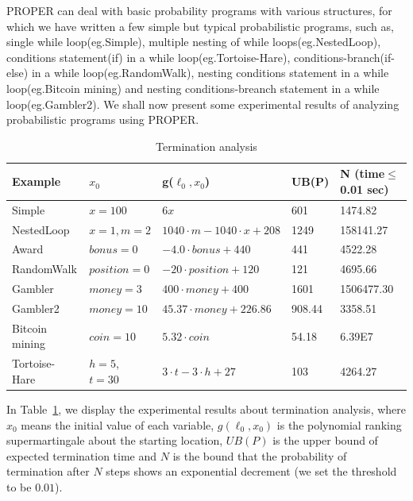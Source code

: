 \documentclass[runningheads]{llncs}
\begin{document}
PROPER can deal with basic probability programs with various structures, for which we have written a few simple but typical probabilistic programs, such as, single while loop(eg.Simple), multiple nesting of while loops(eg.NestedLoop), conditions statement(if) in a while loop(eg.Tortoise-Hare), conditions-branch(if-else) in a while loop(eg.RandomWalk), nesting conditions statement in a while loop(eg.Bitcoin mining) and nesting conditions-breanch statement in a while loop(eg.Gambler2).
We shall now present some experimental results of analyzing probabilistic programs using PROPER. 

\begin{table}[htb]
	\centering
	\caption{Termination analysis}  
	\label{TerminationResult} 
	\begin{center}  
		\begin{tabular}{|l|l|l|l|l|}  
			\hline  	
			Example & $x_0$ & g($\ell_0,x_0$) & UB(P) & N (time$\leq$0.01 sec)\\ \hline  	
			Simple & $x=100$  & $6x$ & 601 & 1474.82 \\ \hline  		
			NestedLoop & $x=1, m=2$ & $1040\cdot m-1040\cdot x+208$ & 1249 & 158141.27 \\  \hline  
			Award & $bonus=0$ & $-4.0\cdot bonus+440$ & 441 &4522.28 \\  \hline  
			RandomWalk & $position=0$ & $-20\cdot position+120$ & 121 & 4695.66 \\  \hline  
			Gambler& $money=3$ & $400\cdot money+400$ & 1601 & 1506477.30 \\ \hline  		 
			Gambler2 & $money=10$ & $45.37 \cdot money+226.86$ & 908.44 & 3358.51 \\  \hline  
			Bitcoin mining & $coin=10$ & $5.32 \cdot coin$ & 54.18 & 6.39E7 \\  \hline 
			Tortoise-Hare & $h=5$, $t=30$ & $3\cdot t-3 \cdot h+27$ & 103 & 4264.27 \\  \hline  
		\end{tabular}  
	\end{center}  
\end{table}

In Table~\ref{TerminationResult}, we display the experimental results about termination analysis, where $x_0$ means the initial value of each variable, $g(\ell_0,x_0)$ is the polynomial ranking supermartingale about the starting location, $UB(P)$ is the upper bound of expected termination time and $N$ is the bound that the probability of termination after $N$ steps shows an exponential decrement (we set the threshold to  be $0.01$).
\end{document}
